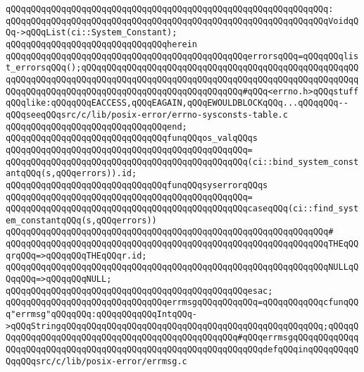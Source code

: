 \verb|qQQqqQQqqQQqqQQqqQQqqQQqqQQqqQQqqQQqqQQqqQQqqQQqqQQqqQQqqQQqqQQq:|\newline
\verb|qQQqqQQqqQQqqQQqqQQqqQQqqQQqqQQqqQQqqQQqqQQqqQQqqQQqqQQqqQQqqQQqVoidqQQq->qQQqList(ci::System_Constant);|\newline
\verb|qQQqqQQqqQQqqQQqqQQqqQQqqQQqqQQqherein|\newline
\verb|qQQqqQQqqQQqqQQqqQQqqQQqqQQqqQQqqQQqqQQqqQQqqQQqerrorsqQQq=qQQqqQQqlist_errorsqQQq();qQQqqQQqqQQqqQQqqQQqqQQqqQQqqQQqqQQqqQQqqQQqqQQqqQQqqQQqqQQqqQQqqQQqqQQqqQQqqQQqqQQqqQQqqQQqqQQqqQQqqQQqqQQqqQQqqQQqqQQqqQQqqQQqqQQqqQQqqQQqqQQqqQQqqQQqqQQqqQQqqQQqqQQqqQQq#qQQq<errno.h>qQQqstuffqQQqlike:qQQqqQQqEACCESS,qQQqEAGAIN,qQQqEWOULDBLOCKqQQq...qQQqqQQq--qQQqseeqQQqsrc/c/lib/posix-error/errno-sysconsts-table.c|\newline
\verb|qQQqqQQqqQQqqQQqqQQqqQQqqQQqqQQqend;|\newline
\newline
\newline
\verb|qQQqqQQqqQQqqQQqqQQqqQQqqQQqqQQqfunqQQqos_valqQQqs|\newline
\verb|qQQqqQQqqQQqqQQqqQQqqQQqqQQqqQQqqQQqqQQqqQQqqQQq=|\newline
\verb|qQQqqQQqqQQqqQQqqQQqqQQqqQQqqQQqqQQqqQQqqQQqqQQq(ci::bind_system_constantqQQq(s,qQQqerrors)).id;|\newline
\newline
\newline
\verb|qQQqqQQqqQQqqQQqqQQqqQQqqQQqqQQqfunqQQqsyserrorqQQqs|\newline
\verb|qQQqqQQqqQQqqQQqqQQqqQQqqQQqqQQqqQQqqQQqqQQqqQQq=|\newline
\verb|qQQqqQQqqQQqqQQqqQQqqQQqqQQqqQQqqQQqqQQqqQQqqQQqcaseqQQq(ci::find_system_constantqQQq(s,qQQqerrors))|\newline
\verb|qQQqqQQqqQQqqQQqqQQqqQQqqQQqqQQqqQQqqQQqqQQqqQQqqQQqqQQqqQQqqQQq#|\newline
\verb|qQQqqQQqqQQqqQQqqQQqqQQqqQQqqQQqqQQqqQQqqQQqqQQqqQQqqQQqqQQqqQQqTHEqQQqrqQQq=>qQQqqQQqTHEqQQqr.id;|\newline
\verb|qQQqqQQqqQQqqQQqqQQqqQQqqQQqqQQqqQQqqQQqqQQqqQQqqQQqqQQqqQQqqQQqNULLqQQqqQQq=>qQQqqQQqNULL;|\newline
\verb|qQQqqQQqqQQqqQQqqQQqqQQqqQQqqQQqqQQqqQQqqQQqqQQqesac;|\newline
\newline
\newline
\verb|qQQqqQQqqQQqqQQqqQQqqQQqqQQqqQQqerrmsgqQQqqQQqqQQq=qQQqqQQqqQQqcfunqQQq"errmsg"qQQqqQQq:qQQqqQQqqQQqIntqQQq->qQQqStringqQQqqQQqqQQqqQQqqQQqqQQqqQQqqQQqqQQqqQQqqQQqqQQqqQQq;qQQqqQQqqQQqqQQqqQQqqQQqqQQqqQQqqQQqqQQqqQQqqQQqqQQq#qQQqerrmsgqQQqqQQqqQQqqQQqqQQqqQQqqQQqqQQqqQQqqQQqqQQqqQQqqQQqqQQqqQQqqQQqdefqQQqinqQQqqQQqqQQqqQQqsrc/c/lib/posix-error/errmsg.c|\newline

